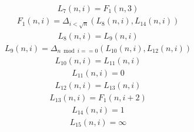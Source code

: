 \documentclass{article}
\begin{document}
\begin{equation*}\begin{split}
L_{7} \left(n,i \right) = F_{1} \left(n,3 \right)
\end{split}\end{equation*}
\begin{equation*}\begin{split}
F_{1} \left(n,i \right) = \Delta_{i < \sqrt{n}} \left(L_{8} \left(n,i \right),L_{14} \left(n,i \right) \right)
\end{split}\end{equation*}
\begin{equation*}\begin{split}
L_{8} \left(n,i \right) = L_{9} \left(n,i \right)
\end{split}\end{equation*}
\begin{equation*}\begin{split}
L_{9} \left(n,i \right) = \Delta_{n  \bmod{} i == 0} \left(L_{10} \left(n,i \right),L_{12} \left(n,i \right) \right)
\end{split}\end{equation*}
\begin{equation*}\begin{split}
L_{10} \left(n,i \right) = L_{11} \left(n,i \right)
\end{split}\end{equation*}
\begin{equation*}\begin{split}
L_{11} \left(n,i \right) = 0
\end{split}\end{equation*}
\begin{equation*}\begin{split}
L_{12} \left(n,i \right) = L_{13} \left(n,i \right)
\end{split}\end{equation*}
\begin{equation*}\begin{split}
L_{13} \left(n,i \right) = F_{1} \left(n,i + 2 \right)
\end{split}\end{equation*}
\begin{equation*}\begin{split}
L_{14} \left(n,i \right) = 1
\end{split}\end{equation*}
\begin{equation*}\begin{split}
L_{15} \left(n,i \right) = \infty
\end{split}\end{equation*}
\end{document}
